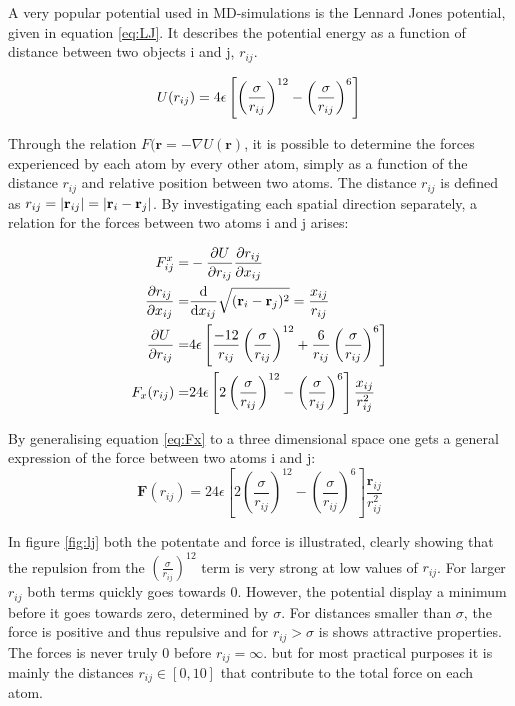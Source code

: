 A very popular potential used in MD-simulations is the Lennard Jones potential, given in equation \ref{eq:LJ}. It describes the potential energy as a function of distance between two objects i and j, $ r_{ij} $. 

\begin{equation}\label{eq:LJ}
	U(r_{ij}) = 4\epsilon \left[	\left(\frac{\sigma}{r_{ij}}	\right)^{12}		- \left(\frac{\sigma}{r_{ij}}	\right)^{6}				\right]\\
\end{equation}




Through the relation $ 	F (\textbf{r} = -\nabla U(\textbf{r}) $, it is possible to determine the forces experienced by each atom by every other atom, simply as a function of the distance $ r_{ij} $ and relative position between two atoms. The distance $ r_{ij} $ is defined as  $ r_{ij}  = \abs{\textbf{r}_{ij}} = \abs{\textbf{r}_i - \textbf{r}_j} 	 $. By investigating each spatial direction separately, a relation for the forces between two atoms i and j arises: 

\begin{align}
		F_{ij}^x =& - \pdv{U}{r_{ij}} \pdv{r_{ij}}{x_{ij}}	\\	
		\pdv{r_{ij}}{x_{ij}} 		=& 			 \dv{x_{ij}} \sqrt{ (\textbf{r}_i - \textbf{r}_j)^2}	= \frac{x_{ij}}{r_{ij}}\\
		 \pdv{U}{r_{ij}} =& 4\epsilon \left[\frac{-12}{r_{ij}}\left(	\frac{\sigma}{r_{ij}}\right)^{12}		+  \frac{6}{r_{ij}} \left(\frac{\sigma}{r_{ij}}	\right)^{6}				\right]\\
		 F_x(r_{ij}) =& 24 \epsilon \left[		2	\left(\frac{\sigma}{r_{ij}}	\right)^{12}		- \left(\frac{\sigma}{r_{ij}}	\right)^{6}				\right] \frac{x_{ij}}{r_{ij}^2} \label{eq:Fx}
\end{align}

By generalising equation \ref{eq:Fx} to a three dimensional space one gets a general expression of the force between two atoms i and j: 
\begin{equation}\label{eq:F}
		  \textbf{F}(r_{ij}) = 24 \epsilon \left[		2	\left(\frac{\sigma}{r_{ij}}	\right)^{12}		- \left(\frac{\sigma}{r_{ij}}	\right)^{6}				\right] \frac{\textbf{r}_{ij}}{r_{ij}^2}
\end{equation}

In figure \ref{fig:lj} both the potentate and force is illustrated, clearly showing that the repulsion from the $ \left(	\frac{\sigma}{r_{ij}}\right)^{12} $ term is very strong at low values of $ r_{ij}$. For larger $ r_{ij} $ both terms quickly goes towards 0. However, the potential display a minimum before it goes towards zero, determined by $ \sigma $. For distances smaller than $ \sigma $, the force is positive and thus repulsive and for $ r_{ij} >\sigma $ is shows attractive properties. The forces is never truly 0 before $ r_{ij}  = \infty$. but for most practical purposes it is mainly the distances $ r_{ij} \in [0,10] $ that contribute to the total force on each atom. 


